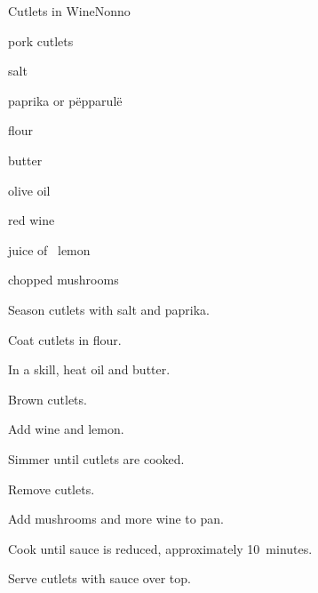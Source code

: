 \begin{recipe}{Cutlets in Wine}{Nonno}{}

\begin{ingredients}
\item pork cutlets
\item salt
\item paprika or p\"epparul\"e
\item flour
\item butter
\item olive oil
\item red wine
\item juice of \half{}~lemon
\item chopped mushrooms
\end{ingredients}

\begin{directions}
\item Season cutlets with salt and paprika.
\item Coat cutlets in flour.
\item In a skill, heat oil and butter.
\item Brown cutlets.
\item Add wine and lemon.
\item Simmer until cutlets are cooked.
\item Remove cutlets.
\item Add mushrooms and more wine to pan.
\item Cook until sauce is reduced, approximately 10~minutes.
\item Serve cutlets with sauce over top.
\end{directions}

\end{recipe}
